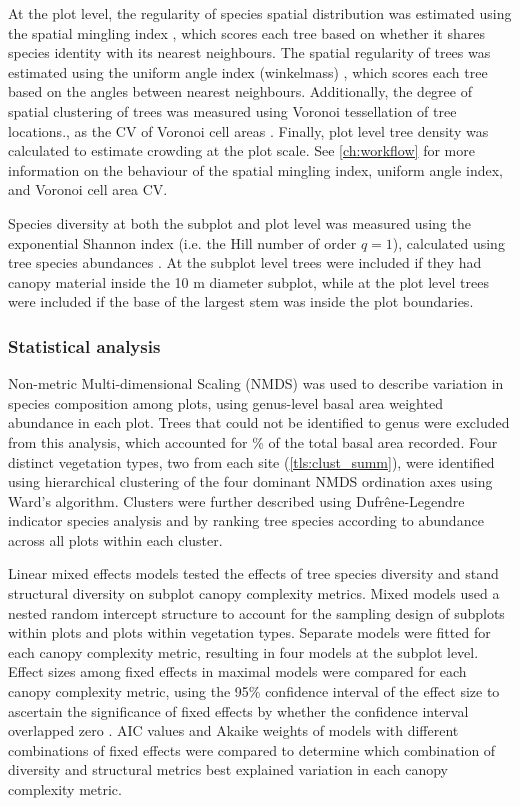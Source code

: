 \begin{refsection}
At the plot level, the regularity of species spatial distribution was estimated using the spatial mingling index \citep{Gadow2002}, which scores each tree based on whether it shares species identity with its nearest neighbours. The spatial regularity of trees was estimated using the uniform angle index (winkelmass) \citep{Gadow2002}, which scores each tree based on the angles between nearest neighbours. Additionally, the degree of spatial clustering of trees was measured using Voronoi tessellation of tree locations., as the CV of Voronoi cell areas \citep{Ong2012}. Finally, plot level tree density was calculated to estimate crowding at the plot scale. See \autoref{ch:workflow} for more information on the behaviour of the spatial mingling index, uniform angle index, and Voronoi cell area CV.

Species diversity at both the subplot and plot level was measured using the exponential Shannon index (i.e. the Hill number of order $q=1$), calculated using tree species abundances \citep{Jost2006}. At the subplot level trees were included if they had canopy material inside the 10 m diameter subplot, while at the plot level trees were included if the base of the largest stem was inside the plot boundaries.

\subsubsection{Statistical analysis}
\label{tls:sssec:stats}

Non-metric Multi-dimensional Scaling (NMDS) was used to describe variation in species composition among plots, using genus-level basal area weighted abundance in each plot. Trees that could not be identified to genus were excluded from this analysis, which accounted for \perIndet{}\% of the total basal area recorded. Four distinct vegetation types, two from each site (\autoref{tls:clust_summ}), were identified using hierarchical clustering of the four dominant NMDS ordination axes using Ward's algorithm. Clusters were further described using Dufr\^{e}ne-Legendre indicator species analysis and by ranking tree species according to abundance across all plots within each cluster. 

Linear mixed effects models tested the effects of tree species diversity and stand structural diversity on subplot canopy complexity metrics. Mixed models used a nested random intercept structure to account for the sampling design of subplots within plots and plots within vegetation types. Separate models were fitted for each canopy complexity metric, resulting in four models at the subplot level. Effect sizes among fixed effects in maximal models were compared for each canopy complexity metric, using the 95\% confidence interval of the effect size to ascertain the significance of fixed effects by whether the confidence interval overlapped zero \citep{Nakagawa2007}. AIC values and Akaike weights of models with different combinations of fixed effects were compared to determine which combination of diversity and structural metrics best explained variation in each canopy complexity metric. 


\end{refsection}
